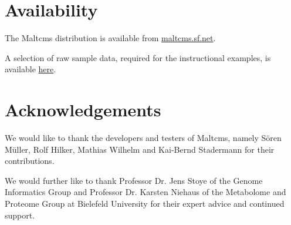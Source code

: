 \documentclass[10pt,a4paper,onecolumn,twoside,titlepage,headsepline,open=any]{scrbook}
\begin{document}
\section*{Availability}
The Maltcms distribution is available from \url{maltcms.sf.net}.

\noindent A selection of raw sample data, required for the instructional examples, is available \href{http://sourceforge.net/projects/maltcms/files/maltcms/example-data/}{here}.

\section*{Acknowledgements}
We would like to thank the developers and testers of Maltcms, namely S\"oren M\"uller, Rolf Hilker, Mathias Wilhelm and Kai-Bernd Stadermann for their contributions.

We would further like to thank Professor Dr. Jens Stoye of the Genome Informatics Group and Professor Dr. Karsten Niehaus of the Metabolome and Proteome Group at Bielefeld University for their expert advice and continued support.
\tableofcontents   %
 
\mainmatter    %




\end{document}
